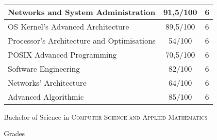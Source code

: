 \documentclass[a4paper,10pt]{article} %
\begin{document}
\begin{center}
\begin{tabular}{lcc}
Networks and System Administration                         &  91,5/100 & 6 \\
\hline
OS Kernel's Advanced Architecture                          &  89,5/100 & 6     \\
Processor's Architecture and Optimisations                 &    54/100 & 6     \\
POSIX Advanced Programming                                 &  70,5/100 & 6     \\
Software Engineering                                       &    82/100 & 6     \\
Networks' Architecture	                                   &    64/100 & 6     \\
Advanced Algorithmic                                       &    85/100 & 6 \\
\hline
\end{tabular}
\end{center}
\bigskip
\bigskip


\newpage

\par{\centering\Large \hypertarget{grds_bs}{Bachelor of Science in \textsc{Computer Science and Applied Mathematics}}\par}\large{\centering Grades\par}\normalsize
\end{document}
